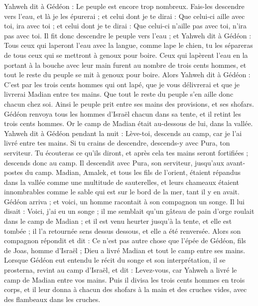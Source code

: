 \begin{multicols}{2}
Yahweh dit à Gédéon : Le peuple est encore trop nombreux. Fais-les descendre vers l'eau, et là je les épurerai ; et celui dont je te dirai : Que celui-ci aille avec toi, ira avec toi ; et celui dont je te dirai : Que celui-ci n’aille pas avec toi, n’ira pas avec toi.
Il fit donc descendre le peuple vers l'eau ; et Yahweh dit à Gédéon : Tous ceux qui laperont l'eau avec la langue, comme lape le chien, tu les sépareras de tous ceux qui se mettront à genoux pour boire.
Ceux qui lapèrent l’eau en la portant à la bouche avec leur main furent au nombre de trois cents hommes, et tout le reste du peuple se mit à genoux pour boire.
Alors Yahweh dit à Gédéon : C’est par les trois cents hommes qui ont lapé, que je vous délivrerai et que je livrerai Madian entre tes mains. Que tout le reste du peuple s'en aille donc chacun chez soi.
Ainsi le peuple prit entre ses mains des provisions, et ses shofars. Gédéon renvoya tous les hommes d'Israël chacun dans sa tente, et il retint les trois cents hommes. Or le camp de Madian était au-dessous de lui, dans la vallée.
Yahweh dit à Gédéon pendant la nuit : Lève-toi, descends au camp, car je l'ai livré entre tes mains.
Si tu crains de descendre, descends-y avec Pura, ton serviteur.
Tu écouteras ce qu'ils diront, et après cela tes mains seront fortifiées ; descends donc au camp. Il descendit avec Pura, son serviteur, jusqu'aux avant-postes du camp.
Madian, Amalek, et tous les fils de l’orient, étaient répandus dans la vallée comme une multitude de sauterelles, et leurs chameaux étaient innombrables comme le sable qui est sur le bord de la mer, tant il y en avait.
Gédéon arriva ; et voici, un homme racontait à son compagnon un songe. Il lui disait : Voici, j'ai eu un songe ; il me semblait qu'un gâteau de pain d'orge roulait dans le camp de Madian ; et il est venu heurter jusqu’à la tente, et elle est tombée ; il l’a retournée sens dessus dessous, et elle a été renversée.
Alors son compagnon répondit et dit : Ce n'est pas autre chose que l'épée de Gédéon, fils de Joas, homme d'Israël ; Dieu a livré Madian et tout le camp entre ses mains.
Lorsque Gédéon eut entendu le récit du songe et son interprétation, il se prosterna, revint au camp d'Israël, et dit : Levez-vous, car Yahweh a livré le camp de Madian entre vos mains.
Puis il divisa les trois cents hommes en trois corps, et il leur donna à chacun des shofars à la main et des cruches vides, avec des flambeaux dans les cruches.

\end{multicols}
